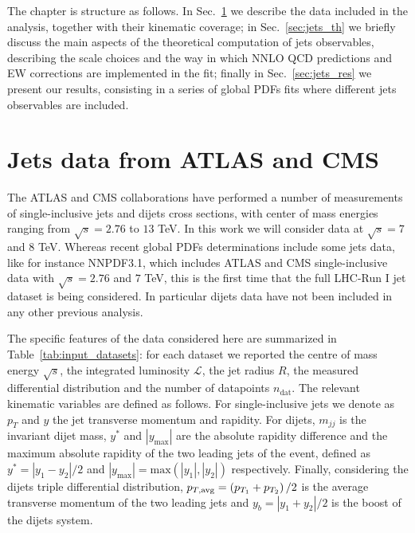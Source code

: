 %
The chapter is structure as follows. In Sec.~\ref{sec:jets_data} we describe the data included in the analysis,
together with their kinematic coverage; in Sec.~\ref{sec:jets_th} we briefly discuss the main aspects of the theoretical
computation of jets observables, describing the scale choices and the way in which NNLO QCD predictions and EW corrections 
are implemented in the fit; finally in Sec.~\ref{sec:jets_res} we present our results, consisting in a series of global
PDFs fits where different jets observables are included.

\section{Jets data from ATLAS and CMS}
\label{sec:jets_data}
The ATLAS and CMS collaborations have performed a number of measurements of single-inclusive jets and 
dijets cross sections, with center of mass energies ranging from $\sqrt{s}=2.76$ to $13$ TeV.
In this work we will consider data at $\sqrt{s}=7$ and $8$ TeV.
%
Whereas recent global PDFs determinations include some jets data, like for instance NNPDF3.1, which includes ATLAS and CMS 
single-inclusive data with $\sqrt{s}=2.76$ and $7$ TeV, this is the first time that the full LHC-Run I jet dataset is being 
considered. In particular dijets data have not been included in any other previous analysis.

%
The specific features of the data considered here are summarized in Table~\ref{tab:input_datasets}:
for each dataset we reported the centre of mass energy $\sqrt{s}$, 
the integrated luminosity $\mathcal{L}$, the jet radius $R$,
the measured differential distribution and the number of datapoints $n_{\text{dat}}$.
The relevant kinematic variables are defined as follows.
For single-inclusive jets we denote as $p_T$ and $y$ the jet transverse momentum and rapidity.
For dijets, $m_{jj}$ is the invariant dijet mass, $y^*$ and $|y_{\text{max}}|$ are the absolute rapidity difference
and the maximum absolute rapidity of the two leading jets of the event, defined as $y^*=|y_1-y_2|/2$
and $|y_{\text{max}}|= \text{max}\left(|y_1|,|y_2|\right)$ respectively.
Finally, considering the dijets triple differential distribution,
$p_{T,\rm avg} = \left(p_{T_1}+p_{T_2}\right)/2$ is the average transverse momentum of the two leading jets and 
$y_b = |y_1+y_2|/2$ is the boost of the dijets system.


